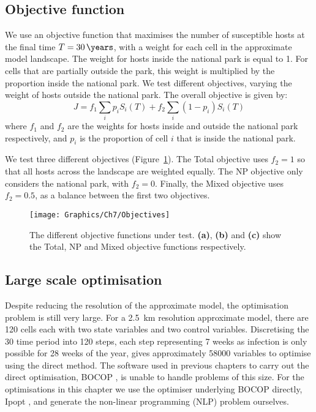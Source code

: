 \subsection{Objective function}

We use an objective function that maximises the number of susceptible hosts at the final time $T=\text{\SI{30}{\years}}$, with a weight for each cell in the approximate model landscape. The weight for hosts inside the national park is equal to 1. For cells that are partially outside the park, this weight is multiplied by the proportion inside the national park. We test different objectives, varying the weight of hosts outside the national park. The overall objective is given by:
\begin{equation}
    J = f_1\sum_ip_iS_i(T) + f_2\sum_i(1-p_i)S_i(T)
\end{equation}
where $f_1$ and $f_2$ are the weights for hosts inside and outside the national park respectively, and $p_i$ is the proportion of cell $i$ that is inside the national park.

We test three different objectives (Figure~\ref{fig:ch7:objectives}). The Total objective uses $f_2=1$ so that all hosts across the landscape are weighted equally. The NP objective only considers the national park, with $f_2=0$. Finally, the Mixed objective uses $f_2=0.5$, as a balance between the first two objectives.

\begin{figure}
    \begin{center}
        \texttt{[image: Graphics/Ch7/Objectives]}
        \caption[Objective functions under test]{The different objective functions under test. \textbf{(a)}, \textbf{(b)} and \textbf{(c)} show the Total, NP and Mixed objective functions respectively.\label{fig:ch7:objectives}}
    \end{center}
\end{figure}

\subsection{Large scale optimisation}

Despite reducing the resolution of the approximate model, the optimisation problem is still very large. For a \SI{2.5}{\km} resolution approximate model, there are 120 cells each with two state variables and two control variables. Discretising the \SI{30}{\year} time period into 120 steps, each step representing 7 weeks as infection is only possible for 28 weeks of the year, gives approximately \num{58000} variables to optimise using the direct method. The software used in previous chapters to carry out the direct optimisation, BOCOP \citep{bocop}, is unable to handle problems of this size. For the optimisations in this chapter we use the optimiser underlying BOCOP directly, Ipopt \citep{wachter_implementation_2006}, and generate the non-linear programming (NLP) problem ourselves.


